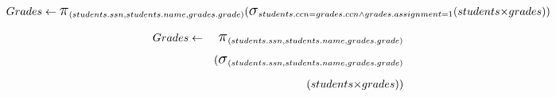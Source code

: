     \begin{displaymath}
    Grades \leftarrow \mbox{\Large$\pi$}_{(students.ssn, students.name, grades.grade)} \\
    (\mbox{\Large$\sigma$}_{students.ccn = grades.ccn \wedge grades.assignment = 1} \\
    (students \mbox{$\times$} grades)) \\
    \end{displaymath}
    
    \begin{eqnarray*}
    Grades & \leftarrow & \mbox{\Large$\pi$}_{(students.ssn, students.name, grades.grade)}  \\
           &            &(\mbox{\Large$\sigma$}_{(students.ssn, students.name, grades.grade)}  \\
           &            &          (students \mbox{$\times$} grades)) 
    \end{eqnarray*}